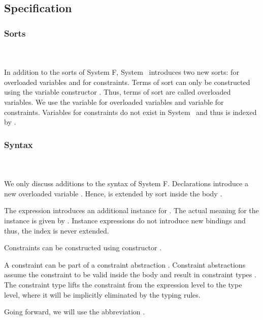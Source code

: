 \subsection{Specification}

\subsubsection{Sorts}\hfill\\\\
In addition to the sorts of System F, System \Fo\ introduces two new sorts:  for overloaded variables and  for constraints.
\FoSort
Terms of sort  can only be constructed using the variable constructor . Thus, terms of sort  are called overloaded variables. We use the variable  for overloaded variables and variable  for constraints. 
Variables for constraints do not exist in System \Fo\ and thus  is indexed by . 

\subsubsection{Syntax}\hfill\\\\
We only discuss additions to the syntax of System F.
\FoTerm
Declarations   introduce a new overloaded variable . 
Hence,  is extended by sort  inside the body . 

\noindent The expression   \Constr{=}    introduces an additional instance for . 
The actual meaning for the instance is given by .
Instance expressions do not introduce new bindings and thus, the index  is never extended.

\noindent Constraints  can be constructed using constructor  \Constr{:} . 

\noindent A constraint  can be part of a constraint abstraction \Constr{\lambdabar}   . Constraint abstractions assume the constraint  to be valid inside the body  and result in constraint types \Constr{[}  \Constr{]⇒} . The constraint type lifts the constraint from the expression level to the type level, where it will be implicitly eliminated by the typing rules.

\noindent Going forward, we will use the abbreviation \FoCstr.

